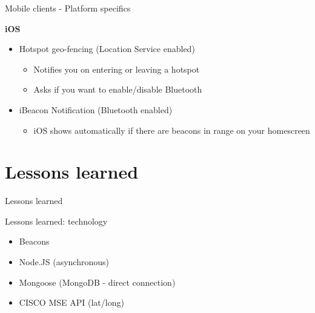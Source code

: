 \documentclass[11pt]{beamer}
\begin{document}
\begin{frame}{Mobile clients - Platform specifics}

  \textbf{iOS}

  \begin{itemize}
    \item Hotspot geo-fencing (Location Service enabled)\\[1em]
    \begin{itemize}
         \item Notifies you on entering or leaving a hotspot
         \item Asks if you want to enable/disable Bluetooth
     \end{itemize}
     \pause
    \item iBeacon Notification (Bluetooth enabled)\\[1em]
    \begin{itemize}
         \item iOS shows automatically if there are beacons in range on your homescreen
     \end{itemize}
  \end{itemize}
\end{frame}


\section{Lessons learned}

\begin{frame}{}

  \begin{center}

    {\Huge Lessons learned}

  \end{center}

\end{frame}


\begin{frame}{Lessons learned: technology}

  \begin{itemize}
    \item Beacons
    \item Node.JS (asynchronous)
    \item Mongoose (MongoDB - direct connection)
    \item CISCO MSE API (lat/long)
  \end{itemize}

\end{frame}
\end{document}
